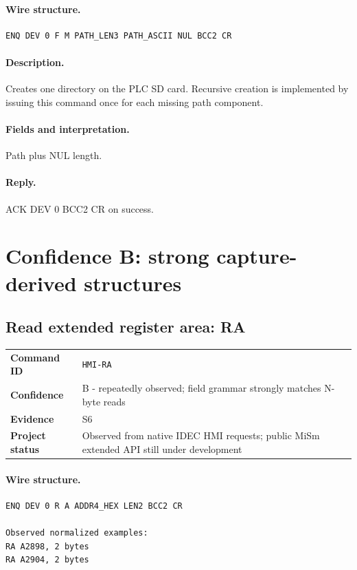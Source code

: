 \documentclass[10pt,letterpaper]{article}
\begin{document}
\paragraph{Wire structure.}
\begin{Verbatim}[breaklines=true,breakanywhere=true,fontsize=\small]
ENQ DEV 0 F M PATH_LEN3 PATH_ASCII NUL BCC2 CR
\end{Verbatim}
\paragraph{Description.} Creates one directory on the PLC SD card. Recursive creation is implemented by issuing this command once for each missing path component.
\paragraph{Fields and interpretation.}
\begin{description}[style=nextline,leftmargin=3.2cm,labelwidth=3.0cm,font=\normalfont\bfseries]
\item[PATH\_LEN3] Path plus NUL length.
\end{description}
\paragraph{Reply.} ACK DEV 0 BCC2 CR on success.

\section{Confidence B: strong capture-derived structures}

\subsection{Read extended register area: RA}
\begin{tabularx}{\textwidth}{@{}>{\bfseries}p{2.8cm}X@{}}
Command ID & \texttt{HMI-RA} \\
Confidence & B - repeatedly observed; field grammar strongly matches N-byte reads \\
Evidence & S6 \\
Project status & Observed from native IDEC HMI requests; public MiSm extended API still under development \\
\end{tabularx}
\vspace{0.35em}
\paragraph{Wire structure.}
\begin{Verbatim}[breaklines=true,breakanywhere=true,fontsize=\small]
ENQ DEV 0 R A ADDR4_HEX LEN2 BCC2 CR

Observed normalized examples:
RA A2898, 2 bytes
RA A2904, 2 bytes
\end{Verbatim}
\end{document}
